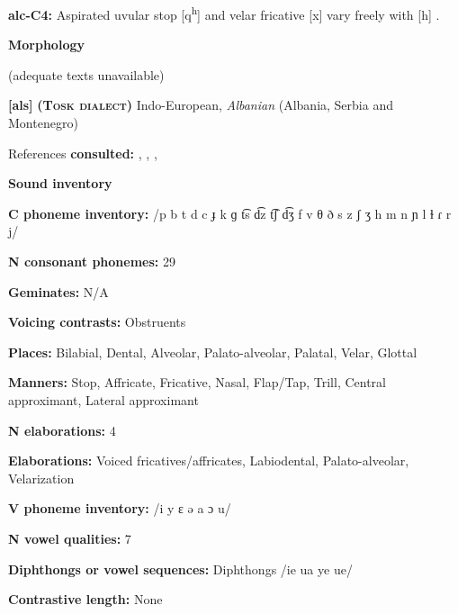\textbf{alc-C4:} Aspirated uvular stop [q\textsuperscript{h}] and velar fricative [x] vary freely with [h] \citep[377-8]{Clairis1985}.



\textbf{Morphology}



(adequate texts unavailable)



\textbf{[als]}   \textbf{\textsc{ (Tosk dialect)}}  Indo-European, \textit{Albanian} (Albania, Serbia and Montenegro)



References \textbf{consulted:} \citet{Bevington1974}, \citet{Klippenstein2010}, \citet{Newmark1957}, \citet{NewmarkEtAl1982}



\textbf{Sound inventory}



\textbf{C phoneme inventory:} /p b t d c ɟ k ɡ t͡s d͡z t͡ʃ d͡ʒ f v θ ð s z ʃ ʒ h m n ɲ l ɫ ɾ r j/



\textbf{N consonant phonemes:} 29



\textbf{Geminates:} N/A



\textbf{Voicing contrasts:} Obstruents



\textbf{Places:} Bilabial, Dental, Alveolar, Palato-alveolar, Palatal, Velar, Glottal



\textbf{Manners:} Stop, Affricate, Fricative, Nasal, Flap/Tap, Trill, Central approximant, Lateral approximant



\textbf{N elaborations:} 4



\textbf{Elaborations:} Voiced fricatives/affricates, Labiodental, Palato-alveolar, Velarization



\textbf{V phoneme inventory:} /i y ɛ ə a ɔ u/



\textbf{N vowel qualities:} 7



\textbf{Diphthongs or vowel sequences:} Diphthongs /ie ua ye ue/



\textbf{Contrastive length:} None



